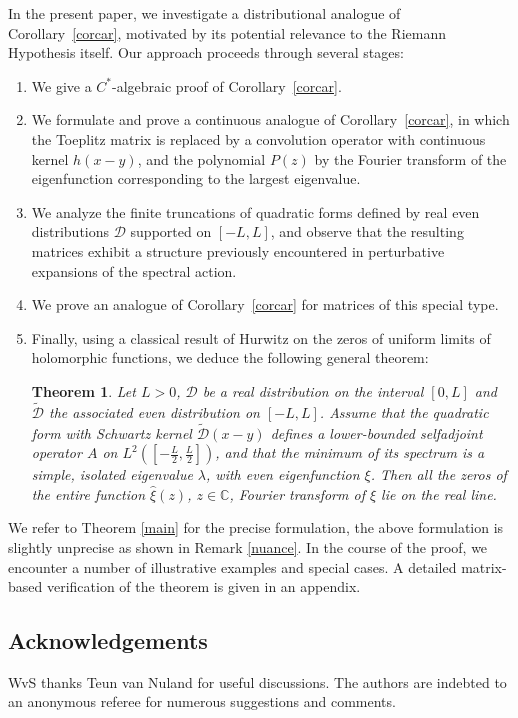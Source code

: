 \documentclass{amsart}
\newtheorem{thm}{Theorem}[section]
\def\C{{\mathbb C}}
\def\cD{{\mathcal D}}
\def\C{{\mathbb C}}
\def\cD{{\mathcal D}}
\def\tilde{\widetilde}
\begin{document}
In the present paper, we investigate a distributional analogue of Corollary~\ref{corcar}, motivated by its potential relevance to the Riemann Hypothesis itself. Our approach proceeds through several stages:

\begin{enumerate}
  \item We give a $C^*$-algebraic proof of Corollary~\ref{corcar}.
  \item We formulate and prove a continuous analogue of Corollary~\ref{corcar}, in which the Toeplitz matrix is replaced by a convolution operator with continuous kernel \( h(x - y) \), and the polynomial \( P(z) \) by the Fourier transform of the eigenfunction corresponding to the largest eigenvalue.
  \item We analyze the finite truncations of quadratic forms defined by real even distributions \( \mathcal{D} \) supported on \( [-L, L] \), and observe that the resulting matrices exhibit a structure previously encountered in perturbative expansions of the spectral action.
  \item We prove an analogue of Corollary~\ref{corcar} for matrices of this special type.
  \item Finally, using a classical result of Hurwitz on the zeros of uniform limits of holomorphic functions, we deduce the following general theorem:
  
\begin{thm}\label{mainintro}
Let \( L > 0 \), \( \mathcal{D} \) be a real  distribution on the interval \( [0, L] \) and $\tilde \cD$ the associated even distribution on \( [-L, L] \). Assume that the quadratic form with Schwartz kernel \( \tilde \cD(x - y) \) defines a lower-bounded selfadjoint operator \( A \) on \( L^2([-\frac{L}{2}, \frac{L}{2}]) \), and that the minimum of its spectrum is a simple, isolated eigenvalue \( \lambda \), with even eigenfunction $\xi$. Then all the zeros of the entire function $\widehat \xi(z)$, $z\in \C$, Fourier transform  of $\xi$ lie on the real line.
\end{thm}
\end{enumerate}
We refer to Theorem \ref{main} for the precise formulation, the above formulation is slightly unprecise as shown in Remark \ref{nuance}.
In the course of the proof, we encounter a number of illustrative examples and special cases. A detailed matrix-based verification of the theorem is given in an appendix.


\subsection*{Acknowledgements}
WvS thanks Teun van Nuland for useful discussions. The authors are indebted to an anonymous referee for numerous suggestions and comments. 
\end{document}
